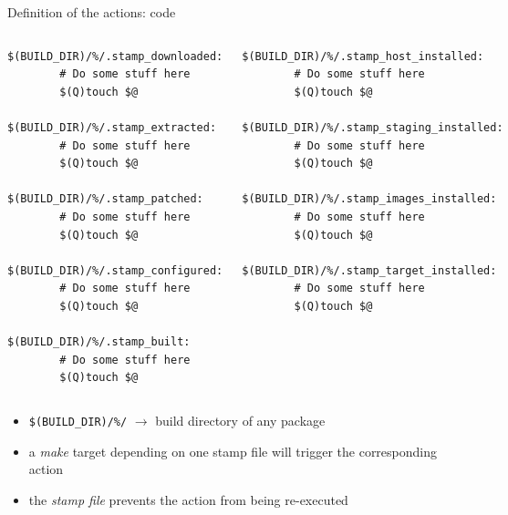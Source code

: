 \begin{frame}[fragile]{Definition of the actions: code}
  \begin{columns}
    \begin{block}{}
    \begin{verbatim}
$(BUILD_DIR)/%/.stamp_downloaded:
        # Do some stuff here
        $(Q)touch $@

$(BUILD_DIR)/%/.stamp_extracted:
        # Do some stuff here
        $(Q)touch $@

$(BUILD_DIR)/%/.stamp_patched:
        # Do some stuff here
        $(Q)touch $@

$(BUILD_DIR)/%/.stamp_configured:
        # Do some stuff here
        $(Q)touch $@

$(BUILD_DIR)/%/.stamp_built:
        # Do some stuff here
        $(Q)touch $@
      \end{verbatim}
      \end{block}
      \begin{block}{}
      \begin{verbatim}
$(BUILD_DIR)/%/.stamp_host_installed:
        # Do some stuff here
        $(Q)touch $@

$(BUILD_DIR)/%/.stamp_staging_installed:
        # Do some stuff here
        $(Q)touch $@

$(BUILD_DIR)/%/.stamp_images_installed:
        # Do some stuff here
        $(Q)touch $@

$(BUILD_DIR)/%/.stamp_target_installed:
        # Do some stuff here
        $(Q)touch $@
    \end{verbatim}
  \end{block}
 \end{columns}

 \begin{itemize}
 \item {\tt \$(BUILD\_DIR)/\%/} $\rightarrow$ build directory of any package
 \item a {\em make} target depending on one stamp file will trigger
   the corresponding action
 \item the {\em stamp file} prevents the action from being re-executed
 \end{itemize}

\end{frame}

